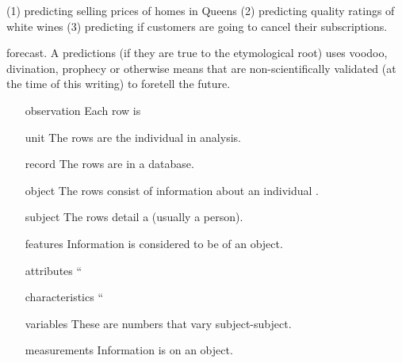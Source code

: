 \documentclass[12pt]{article}
\begin{document}

\begin{enumerate}



(1) predicting selling prices of homes in Queens (2) predicting quality ratings of white wines (3) predicting if customers are going to cancel their subscriptions.


forecast. A predictions (if they are true to the etymological root) uses voodoo, divination, prophecy or otherwise means that are non-scientifically validated (at the time of this writing) to foretell the future.


\begin{enumerate}
\item[observation] Each row is 
\item[unit] The rows are the individual  in analysis.
\item[record] The rows are  in a database.
\item[object] The rows consist of information about an individual .
\item[subject] The rows detail a  (usually a person).\\
\end{enumerate}


\begin{enumerate}
\item[features] Information is considered to be  of an object.
\item[attributes] ``
\item[characteristics] `` 
\item[variables] These are numbers that vary subject-subject.
\item[measurements] Information is  on an object.
\end{enumerate}


\end{enumerate}
\end{document}
